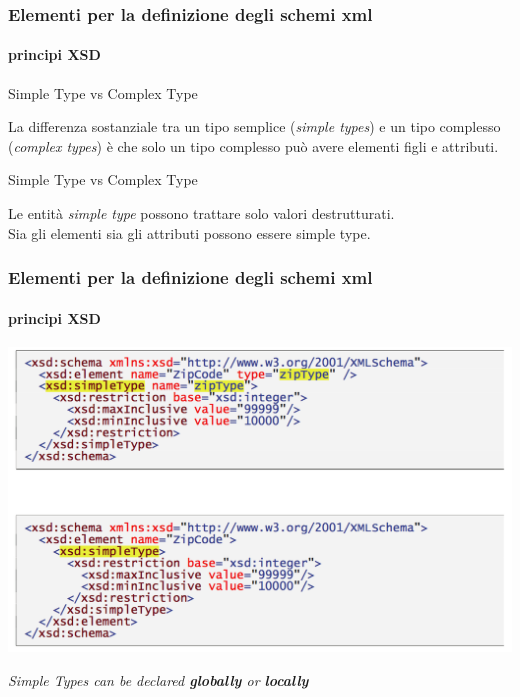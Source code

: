 
\begin{frame}
	\frametitle{Elementi per la definizione degli schemi xml}
	\framesubtitle{principi XSD}
	\addtocounter{nframe}{1}

	\begin{block}{Simple Type vs Complex Type}

		La differenza sostanziale tra un tipo semplice (\textit{simple types}) e un tipo complesso (\textit{complex types}) è che solo un tipo complesso può avere elementi figli e attributi.

	\end{block}

	\begin{block}{Simple Type vs Complex Type}

		Le entità \textit{simple type} possono trattare solo valori destrutturati. 
		\\Sia gli elementi sia gli attributi possono essere simple type.

	\end{block}

\end{frame}



\begin{frame}
	\frametitle{Elementi per la definizione degli schemi xml}
	\framesubtitle{principi XSD}
	\addtocounter{nframe}{1}

	\begin{center}
		\includegraphics[width=.95\textwidth]{imgs/SimpleTypeGlobalLocal.png}
	\end{center}
	\textit{Simple Types can be declared \textbf{globally} or \textbf{locally}}

\end{frame}


